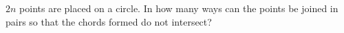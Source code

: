 $2n$ points are placed on a circle. In how many ways can the points be joined in pairs so that the chords formed do not intersect?
